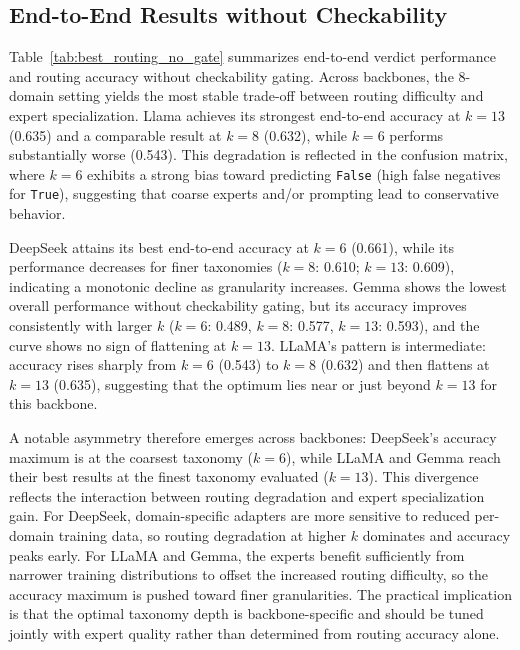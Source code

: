 \subsection{End-to-End Results without Checkability}
Table~\ref{tab:best_routing_no_gate} summarizes end-to-end verdict performance and routing accuracy
without checkability gating. Across backbones, the 8-domain setting yields the most stable
trade-off between routing difficulty and expert specialization. Llama achieves its strongest
end-to-end accuracy at $k{=}13$ (0.635) and a comparable result at $k{=}8$ (0.632), while $k{=}6$
performs substantially worse (0.543). This degradation is reflected in the confusion matrix, where
$k{=}6$ exhibits a strong bias toward predicting \texttt{False} (high false negatives for
\texttt{True}), suggesting that coarse experts and/or prompting lead to conservative behavior.

DeepSeek attains its best end-to-end accuracy at $k{=}6$ (0.661), while its
performance decreases for finer taxonomies ($k{=}8$: 0.610; $k{=}13$: 0.609),
indicating a monotonic decline as granularity increases. Gemma shows the lowest
overall performance without checkability gating, but its accuracy improves
consistently with larger $k$ ($k{=}6$: 0.489, $k{=}8$: 0.577, $k{=}13$: 0.593),
and the curve shows no sign of flattening at $k{=}13$. LLaMA's pattern is
intermediate: accuracy rises sharply from $k{=}6$ (0.543) to $k{=}8$ (0.632) and
then flattens at $k{=}13$ (0.635), suggesting that the optimum lies near or just
beyond $k{=}13$ for this backbone.

A notable asymmetry therefore emerges across backbones: DeepSeek's accuracy
maximum is at the coarsest taxonomy ($k{=}6$), while LLaMA and Gemma reach
their best results at the finest taxonomy evaluated ($k{=}13$). This divergence
reflects the interaction between routing degradation and expert specialization
gain. For DeepSeek, domain-specific adapters are more sensitive to reduced
per-domain training data, so routing degradation at higher $k$ dominates and
accuracy peaks early. For LLaMA and Gemma, the experts benefit sufficiently
from narrower training distributions to offset the increased routing difficulty,
so the accuracy maximum is pushed toward finer granularities. The practical
implication is that the optimal taxonomy depth is backbone-specific and should
be tuned jointly with expert quality rather than determined from routing accuracy
alone.

